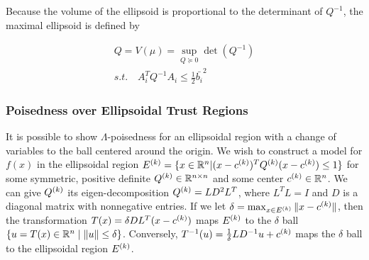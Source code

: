 Because the volume of the ellipsoid is proportional to the determinant of $Q^{-1}$, the maximal ellipsoid is defined by

\begin{align}
 Q = V(\mu) = \sup_{Q \succeq 0} \det(Q^{-1})  \label{ellipse_1} \\
s.t. \quad A_i^T Q^{-1} A_i \le \frac 1 2 \bar{b_i}^2
\end{align}


\subsubsection{Poisedness over Ellipsoidal Trust Regions}
\label{ellipsoidal_lambda}

It is possible to show $\Lambda$-poisedness for an ellipsoidal region with a change of variables to the ball centered around the origin.
We wish to construct a model for $f(x)$ in the ellipsoidal region
${E^{(k)}} = \{x \in \mathbb R^n | (x - {c^{(k)}})^T{Q^{(k)}}(x - {c^{(k)}}) \le 1\}$ for some symmetric, positive definite
${Q^{(k)}} \in \mathbb R^{n\times n}$ and some center ${c^{(k)}} \in \mathbb R^n$.
We can give ${Q^{(k)}}$ its eigen-decomposition ${Q^{(k)}} = L D^2 L^T$, where $L^TL = I$ and $D$ is a diagonal matrix with nonnegative entries.
If we let $\delta = \max_{x\in {E^{(k)}}}\|x-{c^{(k)}}\|$, then the transformation $T(x) = \delta DL^T(x - {c^{(k)}})$ maps $ {E^{(k)}} $ to the $\delta$ ball $\{u = T(x) \in \mathbb R^n \; | \; \|u\| \le \delta\}$.
Conversely, $ T^{-1}(u) = \frac 1 {\delta} LD^{-1}u + {c^{(k)}}$ maps the $\delta$ ball to the ellipsoidal region $ {E^{(k)}} $.


